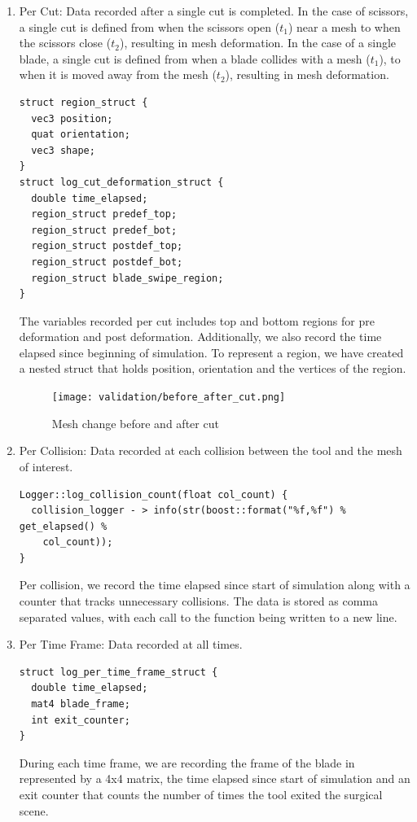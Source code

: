 \begin{enumerate}
    \item Per Cut: Data recorded after a single cut is completed. In the case of scissors, a single cut is defined from when the scissors open ($t_1$) near a mesh to when the scissors close ($t_2$), resulting in mesh deformation. In the case of a single blade, a single cut is defined from when a blade collides with a mesh ($t_1$), to when it is moved away from the mesh ($t_2$), resulting in mesh deformation.
    \begin{lstlisting}[style=CStyle]
struct region_struct {
  vec3 position;
  quat orientation;
  vec3 shape;
}
struct log_cut_deformation_struct {
  double time_elapsed;
  region_struct predef_top;
  region_struct predef_bot;
  region_struct postdef_top;
  region_struct postdef_bot;
  region_struct blade_swipe_region;
}
    \end{lstlisting}
    The variables recorded per cut includes top and bottom regions for pre deformation and post deformation. Additionally, we also record the time elapsed since beginning of simulation. To represent a region, we have created a nested struct that holds position, orientation and the vertices of the region.
    \begin{figure}
      \centering%
      \texttt{[image: validation/before\_after\_cut.png]}
      \caption{Mesh change before and after cut}\label{fig:before_after_cut}
    \end{figure}

    \item Per Collision: Data recorded at each collision between the tool and the mesh of interest.
    \begin{lstlisting}[style=CStyle]
Logger::log_collision_count(float col_count) {
  collision_logger - > info(str(boost::format("%f,%f") % get_elapsed() %
    col_count));
}
    \end{lstlisting}
   Per collision, we record the time elapsed since start of simulation along with a counter that tracks unnecessary collisions. The data is stored as comma separated values, with each call to the function being written to a new line.

    \item Per Time Frame: Data recorded at all times.
    \begin{lstlisting}[style=CStyle]
struct log_per_time_frame_struct {
  double time_elapsed;
  mat4 blade_frame;
  int exit_counter;
}
    \end{lstlisting}
    During each time frame, we are recording the frame of the blade in represented by a 4x4 matrix, the time elapsed since start of simulation and an exit counter that counts the number of times the tool exited the surgical scene.

\end{enumerate}

